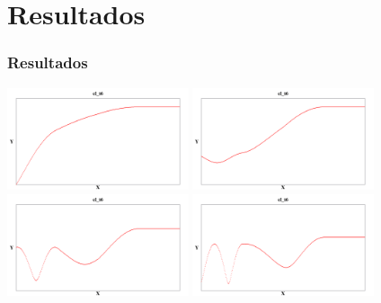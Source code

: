 \documentclass[10pt]{beamer}
\theoremstyle{remark}
\theoremstyle{definition}
\begin{document}
\section{Resultados}
\begin{frame}[allowframebreaks]
\frametitle{Resultados}
	\begin{center}
		\includegraphics[width=0.4\textwidth]{images/pressure_3_65.png}
		\includegraphics[width=0.4\textwidth]{images/pressure_7_30.png}
		\includegraphics[width=0.4\textwidth]{images/pressure_10_95.png}
		\includegraphics[width=0.4\textwidth]{images/pressure_14_60.png}
	\end{center}

	\framebreak
	

\end{frame}
\end{document}
